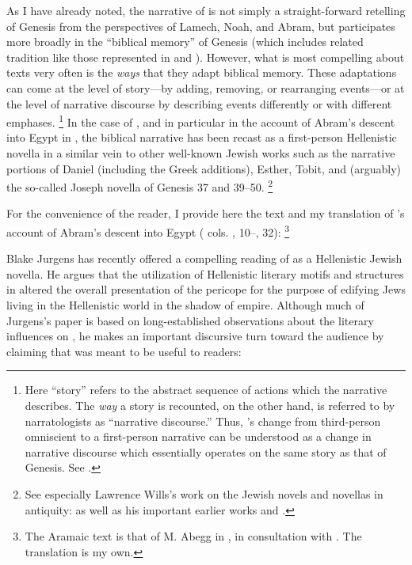As I have already noted, the narrative of \ga is not simply a straight-forward retelling of Genesis from the perspectives of Lamech, Noah, and Abram, but participates more broadly in the ``biblical memory'' of Genesis (which includes related tradition like those represented in \firstenoch and \jub). However, what is most compelling about \rwb texts very often is the \emph{ways} that they adapt biblical memory. These adaptations can come at the level of story---by adding, removing, or rearranging events---or at the level of narrative discourse by describing events differently or with different emphases.%
    \footnote{Here ``story'' refers to the abstract sequence of actions which the narrative describes. The \emph{way} a story is recounted, on the other hand, is referred to by narratologists as ``narrative discourse.'' Thus, \ga's change from third-person omniscient to a \psgraphical first-person narrative can be understood as a change in narrative discourse which essentially operates on the same story as that of Genesis. See \cite[13--27, esp. 18--19]{abbott2008}.}
In the case of \ga, and in particular in the account of Abram's descent into Egypt in , the biblical narrative has been recast as a first-person Hellenistic novella in a similar vein to other well-known \secondtemple Jewish works such as the narrative portions of Daniel (including the Greek additions), Esther, Tobit, and (arguably) the so-called Joseph novella of Genesis 37 and 39--50.%
    \footnote{See especially Lawrence Wills's work on the Jewish novels and novellas in antiquity: \cite*{wills2002} as well as his important earlier works \cite*{wills1995} and \cite*{wills1990}.}

For the convenience of the reader, I provide here the text and my translation of \ga's account of Abram's descent into Egypt ( cols. , 10--, 32):%
    \footnote{The Aramaic text is that of M. Abegg in \cite[1:534--537]{perry-tov2014}, in consultation with \cite{fitzmyer2004}. The translation is my own.}




\noindent
Blake Jurgens has recently offered a compelling reading of \ga {} as a Hellenistic Jewish novella. He argues that the utilization of Hellenistic literary motifs and structures in \ga altered the overall presentation of the pericope for the purpose of edifying Jews living in the Hellenistic world in the shadow of empire.%
    \autocite{jurgens_jsj2018}
Although much of Jurgens's paper is based on long-established observations about the literary influences on \ga, he makes an important discursive turn toward the audience by claiming that \ga was meant to be useful to readers:

